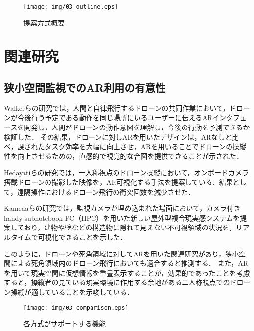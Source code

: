 \documentclass[submit, sigrecommended]{ipsj}
\begin{document}
  \begin{figure}[tb]
  \centering
  \texttt{[image: img/03\_outline.eps]}
  \caption{提案方式概要}
  \label{fig:03_outline}
  \end{figure}

\section{関連研究}
\subsection{狭小空間監視でのAR利用の有意性}
Walkerらの研究\cite{book-ar01}では，人間と自律飛行するドローンの共同作業において，ドローンが今後行う予定である動作を同じ場所にいるユーザーに伝えるARインタフェースを開発し，人間がドローンの動作意図を理解し，今後の行動を予測できるか検証した．
その結果，ドローンに対しARを用いたデザインは，ARなしと比べ，課されたタスク効率を大幅に向上させ，ARを用いることでドローンの操縦性を向上させるための，直感的で視覚的な合図を提供できることが示された．

Hedayatiらの研究\cite{book-ar02}では，一人称視点のドローン操縦において，オンボードカメラ搭載ドローンの撮影した映像を，AR可視化する手法を提案している．結果として，遠隔操作におけるドローン飛行の衝突回数を減少させた．

Kamedaらの研究\cite{book-ar03}では，監視カメラが埋め込まれた場面において，カメラ付きhandy subnotebook PC（HPC）を用いた新しい屋外型複合現実感システムを提案しており，建物や壁などの構造物に隠れて見えない不可視領域の状況を，リアルタイムで可視化できることを示した．

このように，ドローンや死角領域に対してARを用いた関連研究があり，狭小空間による死角領域内のドローン飛行においても適合すると推測する．
また，ARを用いて現実空間に仮想情報を重畳表示することが，効果的であったことを考慮すると，操縦者の見ている現実環境に作用する余地がある二人称視点でのドローン操縦が適していることを示唆している．

  
\begin{figure*}[!tb]
  \centering
  \texttt{[image: img/03\_comparison.eps]}
  \caption{各方式がサポートする機能}
  \label{fig:03_comparison}
\end{figure*}
\end{document}

